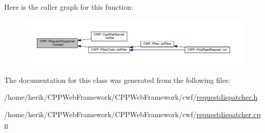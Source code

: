 Here is the caller graph for this function\+:
\nopagebreak
\begin{figure}[H]
\begin{center}
\leavevmode
\includegraphics[width=350pt]{class_c_w_f_1_1_request_dispatcher_a075c11ff233f217196764899f9edf7d0_icgraph}
\end{center}
\end{figure}




The documentation for this class was generated from the following files\+:\begin{DoxyCompactItemize}
\item 
/home/herik/\+C\+P\+P\+Web\+Framework/\+C\+P\+P\+Web\+Framework/cwf/\hyperlink{requestdispatcher_8h}{requestdispatcher.\+h}\item 
/home/herik/\+C\+P\+P\+Web\+Framework/\+C\+P\+P\+Web\+Framework/cwf/\hyperlink{requestdispatcher_8cpp}{requestdispatcher.\+cpp}\end{DoxyCompactItemize}
